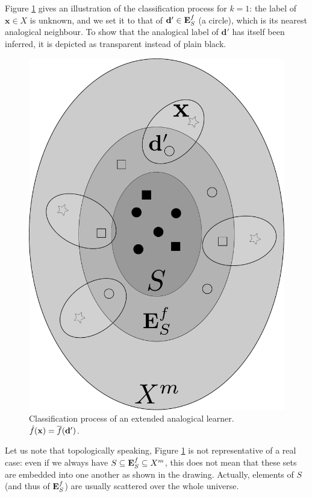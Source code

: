 Figure \ref{FIG:extended_classifier} gives an illustration of the classification process for
$k = 1$: the
label of $\mathbf{x} \in X$ is unknown, and we set it to that of $\mathbf{d}'
\in \mathbf{E}_{S}^{f}$ (a circle), which is its nearest analogical neighbour. To show that
the analogical label of $\mathbf{d}'$ has itself been inferred, it is depicted
as transparent instead of plain black.
\begin{figure}
\begin{center}
\includegraphics[scale=0.20]{figures/extended_classifier.pdf}
\end{center}
  \caption{Classification process of an extended analogical learner.
  $\hat{f}(\mathbf{x}) = \overline{f}(\mathbf{d}')$.}
\label{FIG:extended_classifier}
\end{figure}
Let us note that topologically speaking, Figure \ref{FIG:extended_classifier}
is not representative of a real case: even if we always have $S \subseteq \mathbf{E}_{S}^{f}
\subseteq X^m$, this does not mean that these sets are embedded into one
another as shown in the drawing. Actually, elements of $S$ (and thus of $\mathbf{E}_{S}^{f}$)
are usually scattered over the whole universe.

